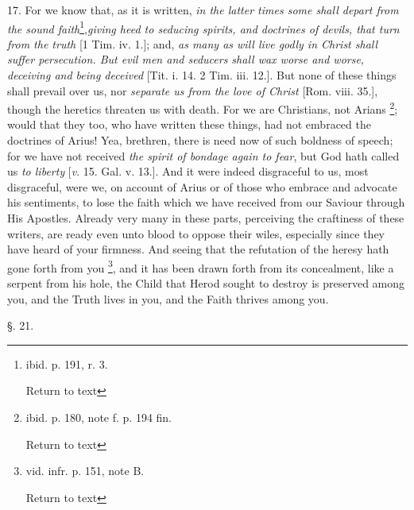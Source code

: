 17. For we know that, as it is written, \emph{in the
latter times some shall depart from the sound faith}\footnote{ibid. p. 191, r. 3.

Return to text},\emph{giving heed to seducing spirits, and doctrines of devils, that
turn from the truth} [1 Tim. iv. 1.]; and, \emph{as many as will live
godly in Christ shall suffer persecution. But evil men and seducers
shall wax worse and worse, deceiving and being deceived} [Tit. i.
14. 2 Tim. iii. 12.]. But none of these things shall prevail over us,
nor \emph{separate us from the love of Christ} [Rom. viii. 35.],
though the heretics threaten us with death. For we are Christians, not
Arians \footnote{ibid. p. 180, note f. p. 194 fin.

Return to text}; would that they too, who
have written these things, had not embraced the doctrines of Arius!
Yea, brethren, there is need now of such boldness of speech; for we
have not received \emph{the spirit of bondage again to fear}, but God
hath called us \emph{to liberty} [\emph{v}. 15. Gal. v. 13.]. And it
were indeed disgraceful to us, most disgraceful, were we, on account
of Arius or of those who embrace and advocate his sentiments, to lose
the faith which we have received from our Saviour through His
Apostles. Already very many in these parts, perceiving the craftiness
of these writers, are ready even unto blood to oppose their wiles,
especially since they have heard of your firmness. And seeing that the
refutation of the heresy hath gone forth from you \footnote{vid. infr. p. 151, note B.

Return to text}, and it has been drawn forth from its concealment, like a serpent
from his hole, the Child that Herod sought to destroy is
preserved among you, and the Truth lives in you, and the Faith thrives
among you.

§. 21.

